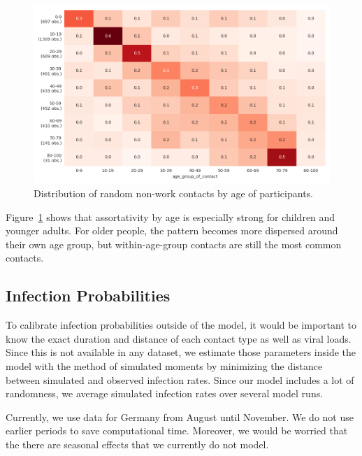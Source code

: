 \begin{figure}[ht]
    \centering
    \includegraphics[width=0.9 \textwidth]{../figures/assortative_matching_probability_example.png}
    \caption{Distribution of random non-work contacts by age of participants.}
    \label{fig:assortativity}
\end{figure}

Figure~\ref{fig:assortativity} shows that assortativity by age is especially strong
for children and younger adults. For older people, the pattern becomes more dispersed
around their own age group, but within-age-group contacts are still the most common
contacts.

\FloatBarrier


\subsection{Infection Probabilities}
\label{sec:estimation}

To calibrate infection probabilities outside of the model, it would be important to know
the exact duration and distance of each contact type as well as viral loads. Since this
is not available in any dataset, we estimate those parameters inside the model with the
method of simulated moments \citep{McFadden1989} by minimizing the distance between
simulated and observed infection rates. Since our model includes a lot of randomness, we
average simulated infection rates over several model runs.

Currently, we use data for Germany from August until November.
We do not use earlier periods to save computational time.
Moreover, we would be worried that the there are seasonal effects that we currently do
not model.

